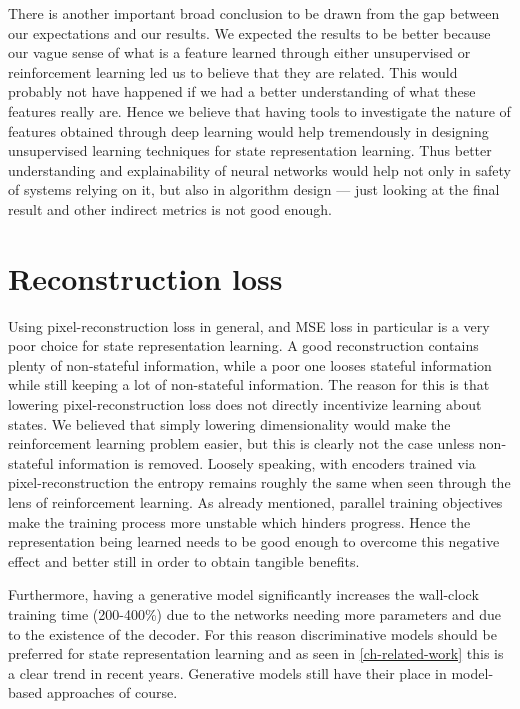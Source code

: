 There is another important broad conclusion to be drawn from the gap between our expectations
and our results.
We expected the results to be better because our vague sense of what is a feature
learned through either unsupervised or reinforcement learning led us to believe that they are related.
This would probably not have happened if we had a better understanding of what these features really are.
Hence we believe that having tools to investigate the nature of features obtained through deep learning would help
tremendously in designing unsupervised learning techniques for state representation learning.
Thus better understanding and explainability of neural networks would help not only
in safety of systems relying on it, but also in algorithm design ---
just looking at the final result and other indirect metrics is not good enough.




\section{Reconstruction loss}
\label{sec-rec-loss-bad}
Using pixel-reconstruction loss in general, and MSE loss in particular is a very poor choice for state representation learning.
A good reconstruction contains plenty of non-stateful information, while a poor one
looses stateful information while still keeping a lot of non-stateful information.
The reason for this is that lowering pixel-reconstruction loss does not directly incentivize learning
about states.
We believed that simply lowering dimensionality would make the reinforcement learning problem easier,
but this is clearly not the case unless non-stateful information is removed.
Loosely speaking,
with encoders trained via pixel-reconstruction the entropy remains roughly the same
when seen through the lens of reinforcement learning.
As already mentioned, parallel training objectives make the training process more unstable
which hinders progress.
Hence the representation being learned needs to be good enough to overcome this negative effect
and better still in order to obtain tangible benefits.

Furthermore, having a generative model significantly increases the wall-clock training time (200-400\%)
due to the networks needing more parameters and due to the existence of the decoder.
For this reason discriminative models should be preferred for state representation learning
and as seen in \ref{ch-related-work} this is a clear trend in recent years.
Generative models still have their place in model-based approaches of course.



